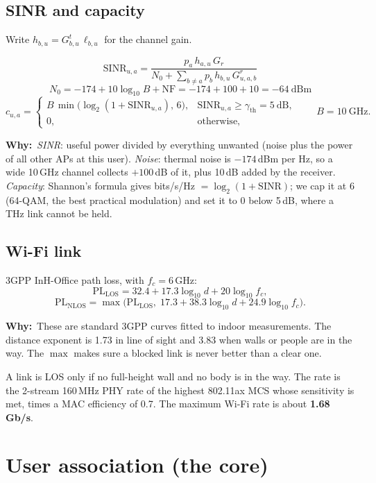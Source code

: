 \documentclass[11pt,a4paper]{article}
\newcommand{\why}[1]{\par\smallskip\noindent\begin{minipage}{\linewidth}\small
  \textcolor{whyc}{\textbf{Why:}}~#1\end{minipage}\par\medskip}
\begin{document}
\subsection{SINR and capacity}
Write $h_{b,u}=G^{t}_{b,u}\,\ell_{b,u}$ for the channel gain.
\begin{keybox}
\[
\mathrm{SINR}_{u,a}=\frac{p_a\,h_{a,u}\,G_r}{N_0+\displaystyle\sum_{b\ne a}p_b\,h_{b,u}\,G^{r}_{u,a,b}}
\]
\[
N_0=-174+10\log_{10}B+\mathrm{NF}=-174+100+10=-64\ \text{dBm}
\]
\[
c_{u,a}=
\begin{cases}
B\,\min\!\big(\log_2(1+\mathrm{SINR}_{u,a}),\,6\big), & \mathrm{SINR}_{u,a}\ge\gamma_{\mathrm{th}}=5\ \text{dB},\\[2pt]
0, & \text{otherwise},
\end{cases}
\qquad B=10\ \text{GHz}.
\]
\end{keybox}
\why{\emph{SINR}: useful power divided by everything unwanted (noise plus the power of all other APs at this user). \emph{Noise}: thermal noise is $-174$\,dBm per Hz, so a wide 10\,GHz channel collects $+100$\,dB of it, plus 10\,dB added by the receiver. \emph{Capacity}: Shannon's formula gives bits/s/Hz $=\log_2(1+\mathrm{SINR})$; we cap it at 6 (64-QAM, the best practical modulation) and set it to 0 below 5\,dB, where a THz link cannot be held.}

\subsection{Wi-Fi link}
3GPP InH-Office path loss, with $f_c=6$\,GHz:
\[
\mathrm{PL}_{\mathrm{LOS}}=32.4+17.3\log_{10}d+20\log_{10}f_c,
\]
\[
\mathrm{PL}_{\mathrm{NLOS}}=\max\!\big(\mathrm{PL}_{\mathrm{LOS}},\;17.3+38.3\log_{10}d+24.9\log_{10}f_c\big).
\]
\why{These are standard 3GPP curves fitted to indoor measurements. The distance exponent is 1.73 in line of sight and 3.83 when walls or people are in the way. The $\max$ makes sure a blocked link is never better than a clear one.}
A link is LOS only if no full-height wall and no body is in the way. The rate is the
2-stream 160\,MHz PHY rate of the highest 802.11ax MCS whose sensitivity is met, times a MAC
efficiency of 0.7. The maximum Wi-Fi rate is about \textbf{1.68\,Gb/s}.

\section{User association (the core)}
\end{document}
